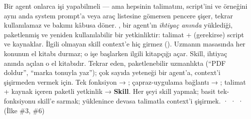 
 Bir agent onlarca işi yapabilmeli --- ama hepsinin talimatını,
script'ini ve örneğini aynı anda system prompt'a veya araç listesine gömersen
pencere şişer, tekrar kullanılamaz ve bakımı kâbusa döner.
 , bir agent'ın \emph{ihtiyaç anında} yüklediği,
paketlenmiş ve yeniden kullanılabilir bir yetkinliktir: talimat + (gerekirse)
script ve kaynaklar. İlgili olmayan skill context'e hiç girmez ().
 Uzmanın masasında her konunun el kitabı durmaz; o işe başlarken ilgili
kitapçığı açar. Skill, ihtiyaç anında açılan o el kitabıdır.
 Tekrar eden, paketlenebilir uzmanlıkta (``PDF doldur'', ``marka
tonuyla yaz''); çok sayıda yeteneği bir agent'a, context'i şişirmeden vermek için.
 Tek fonksiyon → ; çapraz-uygulama bağlantı →
; talimat + kaynak içeren paketli yetkinlik → \textbf{Skill}.
 Her şeyi skill yapmak; basit tek-fonksiyonu skill'e sarmak; yüklenince
devasa talimatla context'i şişirmek.
  ·  ·  ·  \,{\scriptsize\color{softgray}(İlke \#3, \#6)}
